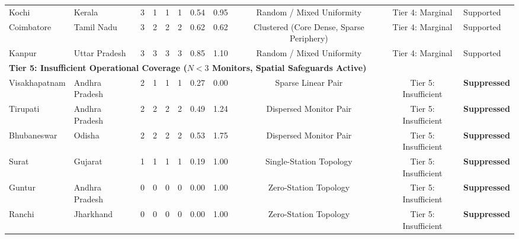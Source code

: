 \begin{table}[t]
\begin{tabular}{llccccccccl}
Kochi & Kerala & 3 & 1 & 1 & 1 & 0.54 & 0.95 & Random / Mixed Uniformity & Tier 4: Marginal & Supported \\
Coimbatore & Tamil Nadu & 3 & 2 & 2 & 2 & 0.62 & 0.62 & Clustered (Core Dense, Sparse Periphery) & Tier 4: Marginal & Supported \\
Kanpur & Uttar Pradesh & 3 & 3 & 3 & 3 & 0.85 & 1.10 & Random / Mixed Uniformity & Tier 4: Marginal & Supported \\
\midrule
\multicolumn{11}{l}{\textbf{Tier 5: Insufficient Operational Coverage ($N < 3$ Monitors, Spatial Safeguards Active)}} \\
Visakhapatnam & Andhra Pradesh & 2 & 1 & 1 & 1 & 0.27 & 0.00 & Sparse Linear Pair & Tier 5: Insufficient & \textbf{Suppressed} \\
Tirupati & Andhra Pradesh & 2 & 2 & 2 & 2 & 0.49 & 1.24 & Dispersed Monitor Pair & Tier 5: Insufficient & \textbf{Suppressed} \\
Bhubaneswar & Odisha & 2 & 2 & 2 & 2 & 0.53 & 1.75 & Dispersed Monitor Pair & Tier 5: Insufficient & \textbf{Suppressed} \\
Surat & Gujarat & 1 & 1 & 1 & 1 & 0.19 & 1.00 & Single-Station Topology & Tier 5: Insufficient & \textbf{Suppressed} \\
Guntur & Andhra Pradesh & 0 & 0 & 0 & 0 & 0.00 & 1.00 & Zero-Station Topology & Tier 5: Insufficient & \textbf{Suppressed} \\
Ranchi & Jharkhand & 0 & 0 & 0 & 0 & 0.00 & 1.00 & Zero-Station Topology & Tier 5: Insufficient & \textbf{Suppressed} \\
\bottomrule
\end{tabular}
\end{table}